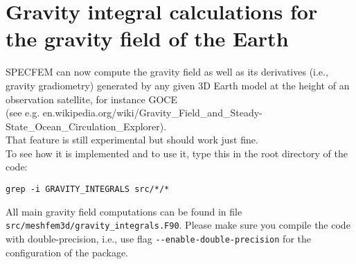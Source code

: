\chapter{Gravity integral calculations for the gravity field of the Earth}


SPECFEM can now compute the gravity field as well as its derivatives (i.e., gravity gradiometry)
generated by any given 3D Earth model at the height
of an observation satellite, for instance GOCE\\
(see e.g. en.wikipedia.org/wiki/Gravity\_Field\_and\_Steady-State\_Ocean\_Circulation\_Explorer).\\
That feature is still experimental but should work just fine.\\

\noindent
To see how it is implemented and to use it, type this in the root directory of the code:
\begin{verbatim}
grep -i GRAVITY_INTEGRALS src/*/*
\end{verbatim}
All main gravity field computations can be found in file \texttt{src/meshfem3d/gravity\_integrals.F90}.
Please make sure you compile the code with double-precision, i.e., use flag \texttt{{-}{-}enable-double-precision} for the
configuration of the package.
